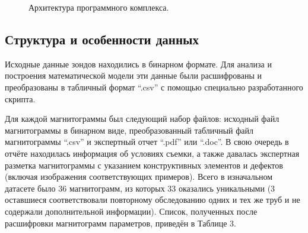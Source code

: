 \documentclass[a4paper,article,14pt]{extarticle}
\begin{document}
\begin{figure}[ht]
    \begin{center}
    
    \caption{
    \label{image3}
    Архитектура программного комплекса.}
    \end {center}
\end {figure}

\subsection{Структура и особенности данных}

Исходные данные зондов находились в бинарном формате. 
Для анализа и построения математической модели 
эти данные были расшифрованы и преобразованы в табличный формат “.csv” 
с помощью специально разработанного скрипта. 

Для каждой магнитограммы был следующий набор файлов: 
исходный файл магнитограммы в бинарном виде, преобразованный 
табличный файл магнитограммы “.csv” и экспертный отчет “.pdf” или “.doc”. 
В свою очередь в отчёте находилась информация об условиях съемки, 
а также давалась экспертная разметка магнитограммы с указанием конструктивных
элементов и дефектов (включая изображения соответствующих примеров). 
Всего в изначальном датасете было 36 магнитограмм, из которых 33 оказались 
уникальными (3 оставшиеся соответствовали повторному обследованию одних и 
тех же труб и не содержали дополнительной информации). Список, полученных после 
расшифровки магнитограмм параметров, приведён в Таблице 3. 
\end{document}
